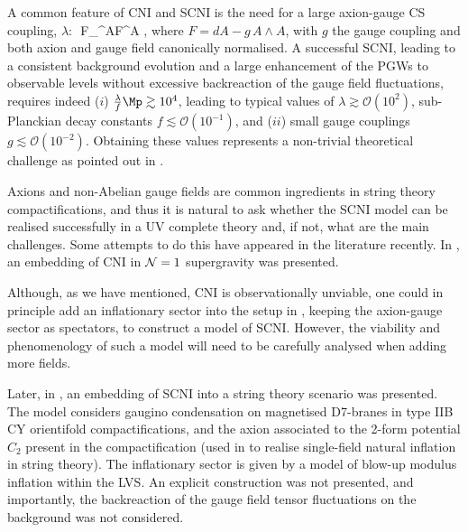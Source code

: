 A common feature of CNI and SCNI is the need for a large
axion-gauge CS coupling, $\lambda$:
\be
{} \,\chi\,F_{\mu\nu}^A\tilde F^{A\,\mu\nu}\,,
\ee
where $F=dA-g\, A\wedge A$, with $g$ the gauge coupling and both axion and gauge field canonically normalised. 
A successful SCNI, leading to a consistent background evolution and a large enhancement of the PGWs to observable levels without excessive backreaction of the
gauge field fluctuations, requires indeed   
($i$) $\frac{\lambda}{f}\Mp\gtrsim 10^4$, leading to typical values of $\lambda\gtrsim {\mathcal O}(10^2)$, sub-Planckian decay constants $f\lesssim  {\mathcal O}(10^{-1})$, and ($ii$) small gauge couplings $g\lesssim  {\mathcal O}(10^{-2})$. Obtaining these values represents a non-trivial theoretical challenge as pointed out  in \cite{Agrawal:2018mkd,Holland:2020jdh,Bagherian:2022mau}. 

Axions and non-Abelian gauge fields are common ingredients in string theory compactifications, and thus it is natural to ask whether the SCNI model can be realised successfully in a UV complete theory and, if not, what are the main challenges. Some attempts to do this have appeared in the literature recently. In \cite{DallAgata:2018ybl}, an embedding of  CNI in ${\cal N}=1$ supergravity was presented. 

Although, as we have mentioned, CNI is observationally
unviable, one could in principle add an inflationary sector into the setup in \cite{DallAgata:2018ybl}, keeping the axion-gauge sector as spectators, to construct a model of SCNI. However, the viability and phenomenology of such a model will need to be carefully analysed when adding more fields.

Later, in \cite{McDonough:2018xzh}, an embedding of SCNI into a  string theory scenario was presented. 
The  model considers  gaugino condensation on magnetised D7-branes in type IIB CY orientifold compactifications, and the axion associated to the 2-form potential $C_2$ present
in the compactification (used in \cite{Long:2014dta,Ben-Dayan:2014lca} to realise single-field natural inflation in string theory). The inflationary sector is given by a model of blow-up modulus inflation within the LVS. 
An explicit construction was not presented, and importantly, the  backreaction of the gauge field tensor fluctuations on the background was not considered. 

